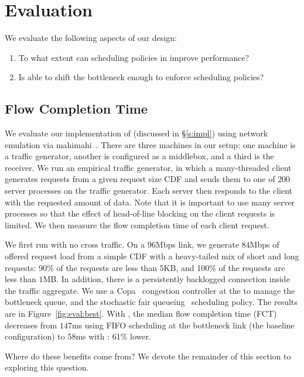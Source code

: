 \section{Evaluation}\label{s:eval}

We evaluate the following aspects of our design:
\begin{enumerate}
    \item To what extent can scheduling policies in \name improve performance?
    \item Is \name able to shift the bottleneck enough to enforce scheduling policies?
\end{enumerate}

\subsection{Flow Completion Time}\label{s:eval:fct}



We evaluate our implementation of \name (discussed in \S\ref{s:impl}) using network emulation via mahimahi~\cite{mahimahi}.
There are three machines in our setup: one machine is a traffic generator, another is configured as a middlebox, and a third is the receiver.
We run an empirical traffic generator, in which a many-threaded client generates requests from a given request size CDF and sends them to one of $200$ server processes on the traffic generator.
Each server then responds to the client with the requested amount of data.
Note that it is important to use many server processes so that the effect of head-of-line blocking on the client requests is limited.
We then measure the flow completion time of each client request.

We first run \name with no cross traffic.
On a $96$Mbps link, we generate $84$Mbps of offered request load from a simple CDF with a heavy-tailed mix of short and long requests: 90\% of the requests are less than $5$KB, and 100\% of the requests are less than $1$MB. 
In addition, there is a persistently backlogged connection inside the traffic aggregate.
We use a Copa~\cite{copa} congestion controller at the \inbox to manage the bottleneck queue, and the stochastic fair queueing~\cite{sfq} scheduling policy.
The results are in Figure~\ref{fig:eval:best}.
With \name, the median flow completion time (FCT) decreases from $147$ms using FIFO scheduling at the bottleneck link (the baseline configuration) to $58$ms with \name: 61\% lower.

Where do these benefits come from? We devote the remainder of this section to exploring this question.

